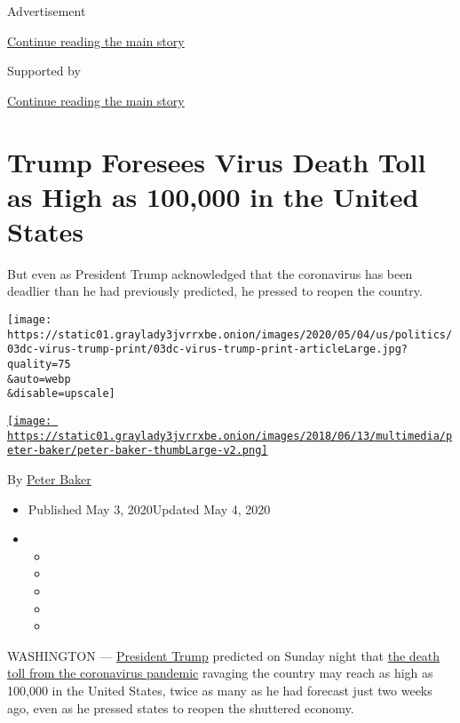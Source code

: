 Advertisement

\protect\hyperlink{after-top}{Continue reading the main story}

Supported by

\protect\hyperlink{after-sponsor}{Continue reading the main story}

\hypertarget{trump-foresees-virus-death-toll-as-high-as-100000-in-the-united-states}{%
\section{Trump Foresees Virus Death Toll as High as 100,000 in the
United
States}\label{trump-foresees-virus-death-toll-as-high-as-100000-in-the-united-states}}

But even as President Trump acknowledged that the coronavirus has been
deadlier than he had previously predicted, he pressed to reopen the
country.

\texttt{[image: https://static01.graylady3jvrrxbe.onion/images/2020/05/04/us/politics/03dc-virus-trump-print/03dc-virus-trump-print-articleLarge.jpg?quality=75\\\&auto=webp\\\&disable=upscale]}

\href{https://www.nytimes3xbfgragh.onion/by/peter-baker}{\texttt{[image: https://static01.graylady3jvrrxbe.onion/images/2018/06/13/multimedia/peter-baker/peter-baker-thumbLarge-v2.png]}}

By \href{https://www.nytimes3xbfgragh.onion/by/peter-baker}{Peter Baker}

\begin{itemize}
\item
  Published May 3, 2020Updated May 4, 2020
\item
  \begin{itemize}
  \item
  \item
  \item
  \item
  \item
  \end{itemize}
\end{itemize}

WASHINGTON ---
\href{https://www.nytimes3xbfgragh.onion/2020/05/04/us/politics/trump-coronavirus-death-toll.html}{President
Trump} predicted on Sunday night that
\href{https://www.nytimes3xbfgragh.onion/interactive/2020/us/coronavirus-us-cases.html}{the
death toll from the coronavirus pandemic} ravaging the country may reach
as high as 100,000 in the United States, twice as many as he had
forecast just two weeks ago, even as he pressed states to reopen the
shuttered economy.

